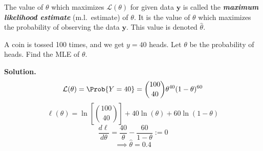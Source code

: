 \begin{Definition}{}{}
    The value of $ \theta $ which maximizes $ \mathcal{L}(\theta) $ for given data $ \symbf{y} $
    is called the \textbf{\emph{maximum likelihood estimate}} (m.l.\ estimate) of $ \theta $.
    It is the value of $ \theta $ which maximizes the probability of observing the data
    $ \symbf{y} $. This value is denoted $ \hat{\theta} $.
\end{Definition}



\begin{Example}{}{}
    A coin is tossed 100 times, and we get $ y=40 $ heads. Let $ \theta $
    be the probability of heads. Find the MLE of $ \theta $.

    \textbf{Solution.}
    \[ \mathcal{L}(\theta)=\Prob{Y=40}=\binom{100}{40}\theta^{40}(1-\theta)^{60} \]
    \[ \ell(\theta)=\ln\left[ \binom{100}{40} \right]+40\ln(\theta)+60\ln(1-\theta) \]
    \[ \frac{d\ell}{d\theta}=\frac{40}{\theta} -\frac{60}{1-\theta} :=0 \]
    \[ \implies \hat{\theta}=0.4 \]
\end{Example}
